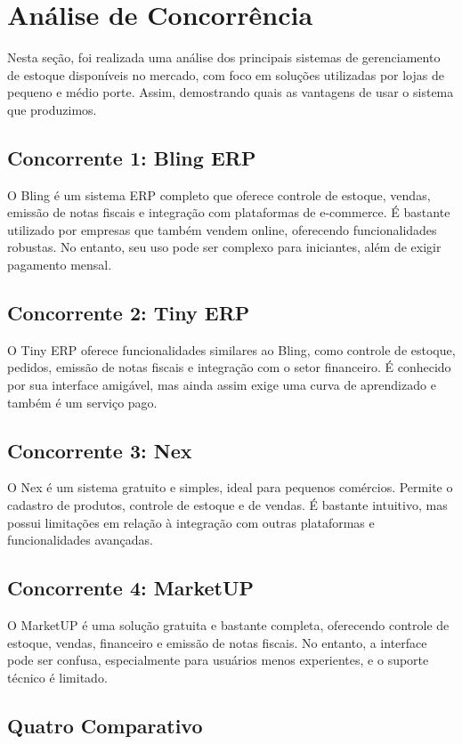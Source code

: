 \documentclass[
	12pt,				%
	openany,			%
	twoside,			%
	a4paper,			%
	english,			%
	brazil				%
	]{abntex2}
\begin{document}
\section{Análise de Concorrência}

Nesta seção, foi realizada uma análise dos principais sistemas de gerenciamento de estoque disponíveis no mercado, com foco em soluções utilizadas por lojas de pequeno e médio porte. Assim, demostrando quais as vantagens de usar o sistema que produzimos.

\subsection{Concorrente 1: Bling ERP}
O Bling é um sistema ERP completo que oferece controle de estoque, vendas, emissão de notas fiscais e integração com plataformas de e-commerce. É bastante utilizado por empresas que também vendem online, oferecendo funcionalidades robustas. No entanto, seu uso pode ser complexo para iniciantes, além de exigir pagamento mensal.

\subsection{Concorrente 2: Tiny ERP}
O Tiny ERP oferece funcionalidades similares ao Bling, como controle de estoque, pedidos, emissão de notas fiscais e integração com o setor financeiro. É conhecido por sua interface amigável, mas ainda assim exige uma curva de aprendizado e também é um serviço pago.

\subsection{Concorrente 3: Nex}
O Nex é um sistema gratuito e simples, ideal para pequenos comércios. Permite o cadastro de produtos, controle de estoque e de vendas. É bastante intuitivo, mas possui limitações em relação à integração com outras plataformas e funcionalidades avançadas.

\subsection{Concorrente 4: MarketUP}
O MarketUP é uma solução gratuita e bastante completa, oferecendo controle de estoque, vendas, financeiro e emissão de notas fiscais. No entanto, a interface pode ser confusa, especialmente para usuários menos experientes, e o suporte técnico é limitado.

\subsection{Quatro Comparativo}
\end{document}
